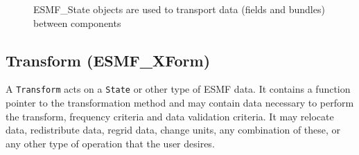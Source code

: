 \begin{figure}
\caption[{ESMF State Role}]{ESMF\_State objects are used to transport data
(fields and bundles) between components}
\label{fig:ESMFSystemDiagram}
\end{figure}

\subsection{Transform (ESMF\_XForm)} 
A {\tt Transform} acts on a {\tt State} or other type of 
ESMF data.  It contains a function pointer to the transformation method
and may contain data necessary to perform the transform, frequency 
criteria and data
validation criteria.  It may relocate data, 
redistribute data, regrid data, change units, any combination of these,
or any other type of operation that the user desires.  









